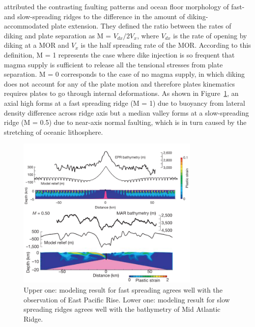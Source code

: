 \citet{Buck2005} attributed the contrasting faulting patterns and ocean floor morphology of fast- and slow-spreading ridges to the difference in the amount of diking-accommodated plate extension. They defined the ratio between the rates of diking and plate separation as M = $V_{dx}/2V_{x}$, where $V_{dx}$ is the rate of opening by diking at a MOR and $V_{x}$ is the half spreading rate of the MOR. According to this definition, M = 1 represents the case where dike injection is so frequent that magma supply is sufficient to release all the tensional stresses from plate separation. M = 0 corresponds to the case of no magma supply, in which diking does not account for any of the plate motion and therefore plates kinematics requires plates to go through internal deformations. As shown in Figure~\ref{fig_Intro5_1}, an axial high forms at a fast spreading ridge (M = 1) due to buoyancy from lateral density difference across ridge axis but a median valley forms at a slow-spreading ridge (M = 0.5) due to near-axis normal faulting, which is in turn caused by the stretching of oceanic lithosphere.


\begin{figure}[h]
 \centering
  \includegraphics[width=0.8\textwidth]{./Figures/fig_Intro5_1.png}
 \caption{\small{Upper one: modeling result for fast spreading agrees well with the observation of East Pacific Rise. Lower one: modeling result for slow spreading ridges agrees well with the bathymetry of Mid Atlantic Ridge. \citep{Buck2005}}}
 \label{fig_Intro5_1}
\end{figure}

